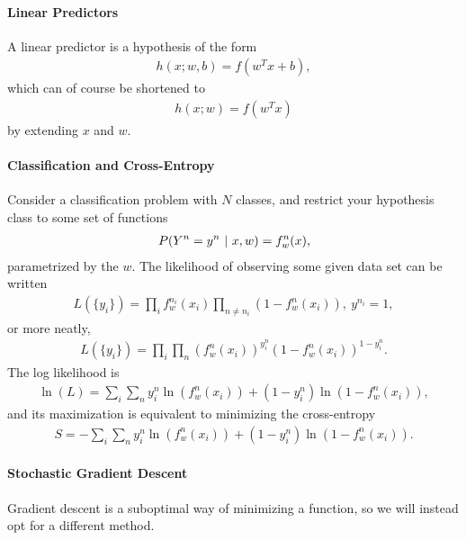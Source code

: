 \paragraph{Linear Predictors}
A linear predictor is a hypothesis of the form
\begin{align*}
	h(x; w, b) = f(w^{T}x + b),
\end{align*}
which can of course be shortened to
\begin{align*}
	h(x; w) = f(w^{T}x)
\end{align*}
by extending $x$ and $w$.

\paragraph{Classification and Cross-Entropy}
Consider a classification problem with $N$ classes, and restrict your hypothesis class to some set of functions
\begin{align*}
	P(Y^{n} = y^{n}\ \vert\  x, w) = f_{w}^{n}(x),
\end{align*}
parametrized by the $w$. The likelihood of observing some given data set can be written
\begin{align*}
	L(\{y_{i}\}) = \prod\limits_{i}f_{w}^{n_{i}}(x_{i})\prod\limits_{n \neq n_{i}}(1 - f_{w}^{n}(x_{i})),\ y^{n_{i}} = 1,
\end{align*}
or more neatly,
\begin{align*}
	L(\{y_{i}\}) = \prod\limits_{i}\prod\limits_{n}(f_{w}^{n}(x_{i}))^{y_{i}^{n}}(1 - f_{w}^{n}(x_{i}))^{1 - y_{i}^{n}}.
\end{align*}
The log likelihood is
\begin{align*}
	\ln(L) = \sum\limits_{i}\sum\limits_{n}y_{i}^{n}\ln(f_{w}^{n}(x_{i})) + (1 - y_{i}^{n})\ln(1 - f_{w}^{n}(x_{i})),
\end{align*}
and its maximization is equivalent to minimizing the cross-entropy
\begin{align*}
	S = -\sum\limits_{i}\sum\limits_{n}y_{i}^{n}\ln(f_{w}^{n}(x_{i})) + (1 - y_{i}^{n})\ln(1 - f_{w}^{n}(x_{i})).
\end{align*}

\paragraph{Stochastic Gradient Descent}
Gradient descent is a suboptimal way of minimizing a function, so we will instead opt for a different method.

